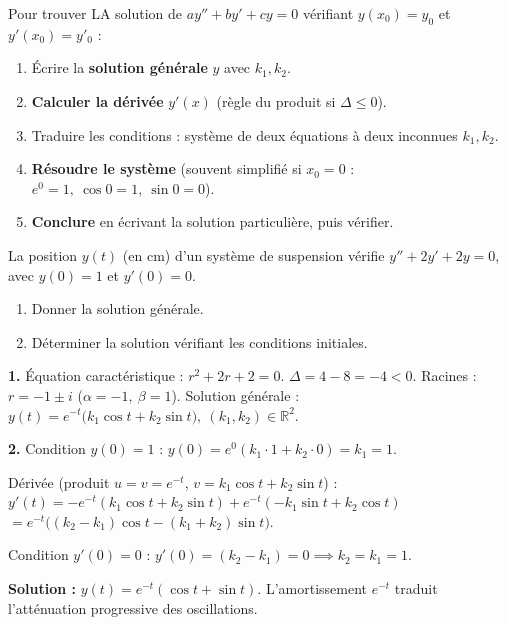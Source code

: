 \documentclass[11pt]{article}
\begin{document}
\begin{methode}
Pour trouver LA solution de $ay'' + by' + cy = 0$ vérifiant $y(x_0) = y_0$ et $y'(x_0) = y'_0$ :
\begin{enumerate}
\item Écrire la \textbf{solution générale} $y$ avec $k_1, k_2$.
\item \textbf{Calculer la dérivée} $y'(x)$ (règle du produit si $\Delta \le 0$).
\item Traduire les conditions : système de deux équations à deux inconnues $k_1, k_2$.
\item \textbf{Résoudre le système} (souvent simplifié si $x_0 = 0$ : $e^0=1,\ \cos 0=1,\ \sin 0=0$).
\item \textbf{Conclure} en écrivant la solution particulière, puis vérifier.
\end{enumerate}
\end{methode}

\begin{exoresolu}
La position $y(t)$ (en cm) d'un système de suspension vérifie $y'' + 2y' + 2y = 0$, avec $y(0) = 1$ et $y'(0) = 0$.
\begin{enumerate}
\item Donner la solution générale.
\item Déterminer la solution vérifiant les conditions initiales.
\end{enumerate}
\tcblower
\textbf{1.} Équation caractéristique : $r^2 + 2r + 2 = 0$.
$\Delta = 4 - 8 = -4 < 0$. Racines : $r = -1 \pm i$ ($\alpha=-1,\ \beta=1$).
Solution générale : $y(t) = e^{-t}\big(k_1 \cos t + k_2 \sin t\big),\ (k_1,k_2)\in\mathbb{R}^2$.

\textbf{2.} Condition $y(0)=1$ : $y(0) = e^0(k_1 \cdot 1 + k_2 \cdot 0) = k_1 = 1$.

Dérivée (produit $u=v=e^{-t}$, $v=k_1\cos t+k_2\sin t$) :
$y'(t) = -e^{-t}(k_1\cos t+k_2\sin t) + e^{-t}(-k_1\sin t+k_2\cos t)$
$= e^{-t}\big((k_2-k_1)\cos t - (k_1+k_2)\sin t\big)$.

Condition $y'(0)=0$ : $y'(0) = (k_2 - k_1) = 0 \implies k_2 = k_1 = 1$.

\textbf{Solution :} $y(t) = e^{-t}(\cos t + \sin t)$.
L'amortissement $e^{-t}$ traduit l'atténuation progressive des oscillations.
\end{exoresolu}
\end{document}
